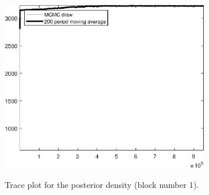 \begin{figure}[H]
\centering
  \includegraphics[width=0.8\textwidth]{BRS_growth_util_sectoral/graphs/TracePlot_Posterior_blck_1}\\
    \caption{Trace plot for the posterior density (block number 1).}
\end{figure}
